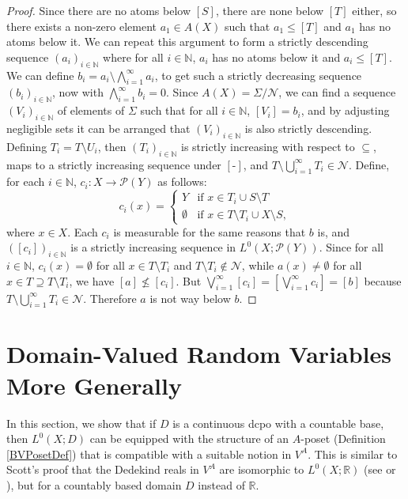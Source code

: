 \documentclass{lmcs}
\newcommand{\blank}{\ensuremath{{\mbox{-}}}}
\newcommand{\R}{\ensuremath{\mathbb{R}}}
\newcommand{\N}{\ensuremath{\mathbb{N}}}
\newcommand{\En}{\mathcal{N}}
\newcommand{\powerset}{\ensuremath{\mathcal{P}}}
\begin{document}
\begin{proof}
Since there are no atoms below $[S]$, there are none below $[T]$ either, so
there exists a non-zero element $a_1 \in A(X)$ such that $a_1 \leq [T]$ and
$a_1$ has no atoms below it. We can repeat this argument to form a strictly descending sequence $(a_i)_{i \in \N}$ where for all $i \in \N$, $a_i$ has no atoms below it and $a_i \leq [T]$. We can define $b_i = a_i \setminus \bigwedge_{i = 1}^\infty a_i$, to get such a strictly decreasing sequence $(b_i)_{i \in \N}$, now with $\bigwedge_{i=1}^\infty b_i = 0$. Since $A(X) = \Sigma/\En$, we can find a sequence $(V_i)_{i \in \N}$ of elements of $\Sigma$ such that for all $i \in \N$, $[V_i] = b_i$, and by adjusting negligible sets it can be arranged that $(V_i)_{i \in \N}$ is also strictly descending. Defining $T_i = T \setminus U_i$, then $(T_i)_{i  \in \N}$ is strictly increasing with respect to $\subseteq$, maps to a strictly increasing sequence under $[\blank]$, and $T \setminus \bigcup_{i = 1}^\infty T_i \in \En$. Define, for
each $i \in \N$, $c_i : X \rightarrow \powerset(Y)$ as follows: 
\[
c_i(x) = \begin{cases} Y   & \text{if } x \in T_i \cup S \setminus T \\
\emptyset & \text{if } x \in T \setminus T_i \cup X \setminus S, \end{cases}
\]
where $x \in X$. Each $c_i$ is measurable for the same reasons
that $b$ is, and $([c_i])_{i \in \N}$ is a strictly increasing sequence in $L^0(X;\powerset(Y))$. Since for all $i \in \N$, $c_i(x) = \emptyset$ for all $x \in T\setminus T_i$ and $T \setminus T_i \not\in \En$, while $a(x) \neq \emptyset$
for all $x \in T \supseteq T \setminus T_i$, we have $[a] \not\leq [c_i]$. But
$\bigvee_{i = 1}^\infty [c_i] = \left[\bigvee_{i=1}^\infty c_i\right] = [b]$
because $T \setminus \bigcup_{i=1}^\infty T_i \in \En$. Therefore $a$ is not way
below $b$.  
\end{proof}

\section{Domain-Valued Random Variables More Generally}
\label{NewRandomVariablesSection}
In this section, we show that if $D$ is a continuous dcpo with a countable base, then $L^0(X;D)$ can be equipped with the structure of an $A$-poset (Definition \ref{BVPosetDef}) that is compatible with a suitable notion in $V^A$. This is similar to Scott's proof that the Dedekind reals in $V^A$ are isomorphic to $L^0(X;\R)$ (see \cite[\S 4.3]{solovay71} or \cite[Theorem 7.1]{bell}), but for a countably based domain $D$ instead of $\R$. 
\end{document}
